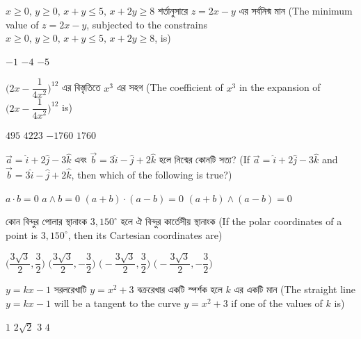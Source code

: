 \documentclass[addpoints]{exam}
\begin{document}
\begin{questions}
\question  $ x\ge 0,\,y\ge 0,\, x+y\le 5,\,x+2y\ge 8 $ শর্তানুসারে $ z=2x-y $ এর সর্বনিন্ম মান (The minimum value of $ z=2x-y $, subjected to the constrains $ x\ge 0,\,y\ge 0,\, x+y\le 5,\,x+2y\ge 8 $, is) 

\begin{oneparchoices}
\choice $ -1 $
\choice $ -4 $
\choice $ -5 $

\end{oneparchoices}

\question  $ \Bigg(2x-\dfrac{1}{4x^2}\Bigg)^{12} $ এর বিস্তৃতিতে $ x^3 $ এর সহগ (The coefficient of $x^3$ in the expansion of $ \Bigg(2x-\dfrac{1}{4x^2}\Bigg)^{12} $ is) 
\begin{oneparchoices}
\choice $ 495 $
\choice $ 4223 $
\choice $ -1760 $
\choice $ 1760 $

\end{oneparchoices}

\question  $ \vec{a}  = \hat{i}+2\hat{j}-3\hat{k} $ এবং $ \vec{b} = 3\hat{i}-\hat{j}+2\hat{k} $ হলে নিন্মের কোনটি সত্য? (If $ \vec{a}  = \hat{i}+2\hat{j}-3\hat{k} $ and $ \vec{b} = 3\hat{i}-\hat{j}+2\hat{k} $, then which of the following is true?)

\begin{oneparchoices}
\choice $ a\cdot b =0  $
\choice $ a\wedge b =0 $
\choice $ (a+b)\cdot (a-b) = 0 $
\choice $ (a+b)\wedge (a-b) = 0 $

\end{oneparchoices}

\question   কোন বিন্দুর পোলার স্থানাংক $ 3,150^{\circ} $ হলে ঐ বিন্দুর কার্তেসীয় স্থানাংক (If the polar coordinates of a point is $ 3,150^{\circ} $, then its Cartesian coordinates are) 

\begin{oneparchoices}
\choice $\Big(\dfrac{3\sqrt{3}}{2}, \dfrac{3}{2} \Big)$
\choice $\Big(\dfrac{3\sqrt{3}}{2}, -\dfrac{3}{2} \Big) $
\choice $\Big(-\dfrac{3\sqrt{3}}{2}, \dfrac{3}{2} \Big) $
\choice $\Big(-\dfrac{3\sqrt{3}}{2}, -\dfrac{3}{2} \Big) $

\end{oneparchoices}


\question $ y=kx-1 $ সরলরেখাটি $ y=x^{2}+3 $ বক্ররেখার একটি স্পর্শক হলে $ k $ এর একটি মান (The straight line $ y=kx-1 $ will be a tangent to the curve $ y=x^{2}+3 $ if one of the values of $k$ is)

\begin{oneparchoices}
\choice $ 1 $
\choice $ 2\sqrt{2} $
\choice $ 3 $
\choice $ 4 $


\end{oneparchoices}
\end{questions}
\end{document}
